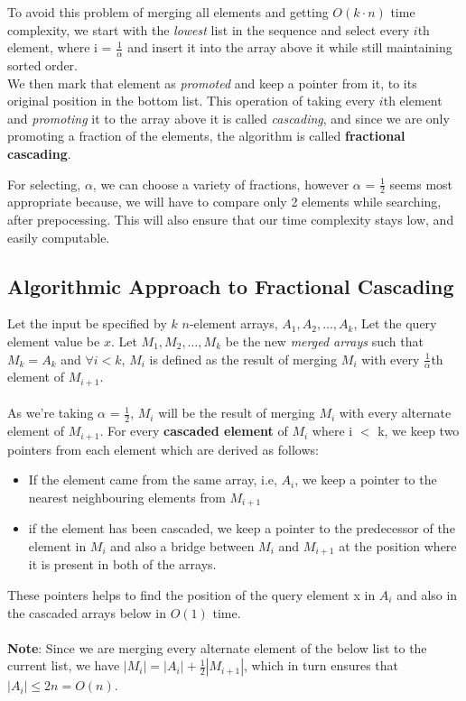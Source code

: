 \documentclass[11pt]{article}
\begin{document}
To avoid this problem of merging all elements and getting $O(k \cdot n)$ time complexity, we start with the \textit{lowest} list in the sequence and select every $i$th element, where i = $\frac{1}{\alpha}$ and insert it into the array above it while still maintaining sorted order. \\
We then mark that element as \textit{promoted} and keep a pointer from it, to its original position in the bottom list. This operation of taking every $i$th element and \textit{promoting} it to the array above it is called \textit{cascading}, and since we are only promoting a fraction of the elements, the algorithm is called \textbf{fractional cascading}.

For selecting, $\alpha$, we can choose a variety of fractions, however $\alpha$ = $\frac{1}{2}$ seems most appropriate because, we will have to compare only 2 elements while searching, after prepocessing. This will also ensure that our time complexity stays low, and easily computable.


\subsection{Algorithmic Approach to Fractional Cascading}

Let the input be specified by $k$ $n$-element arrays, $A_1,A_2,\dots,A_k$, Let the query element value be $x$.
Let $M_1,M_2,\dots,M_k$ be the new \textit{merged arrays} such that $M_k = A_k$ and $\forall i < k$, $M_i$ is defined as the result of merging $M_i$ with every $\frac{1}{\alpha}$th element of $M_{i+1}$. \\ \\
As we're taking $\alpha$ = $\frac{1}{2}$, $M_i$ will be the result of merging $M_i$ with every alternate element of $M_{i+1}$. For every \textbf{cascaded element} of $M_i$ where i $<$ k, we keep two pointers from each element which are derived as follows:
\begin{itemize}
    \item If the element came from the same array, i.e, $A_i$, we keep a pointer to the nearest neighbouring elements from $M_{i+1}$
    \item if the element has been cascaded, we keep a pointer to the predecessor of the element in $M_i$ and also a bridge between $M_i$ and $M_{i+1}$ at the position where it is present in both of the arrays.
\end{itemize}
These pointers helps to find the position of the query element x in $A_i$ and also in the cascaded arrays below in $O(1)$ time. \\ \\
\textbf{Note}: Since we are merging every alternate element of the below list to the current list, we have 
$|M_i| = |A_i| +\frac{1}{2}|M_{i+1}|$, which in turn ensures that $|A_i| \leq 2n = O(n)$. \\
\end{document}
